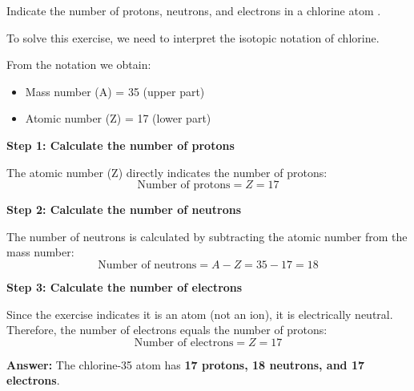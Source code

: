 \begin{exercise}
    Indicate the number of protons, neutrons, and electrons in a chlorine atom .

    \begin{solu}
        To solve this exercise, we need to interpret the isotopic notation of chlorine.

        From the notation  we obtain:
        \begin{itemize}
            \item Mass number (A) = 35 (upper part)
            \item Atomic number (Z) = 17 (lower part)
        \end{itemize}

        \textbf{Step 1: Calculate the number of protons}

        The atomic number (Z) directly indicates the number of protons:
        \[
            \text{Number of protons} = Z = 17
        \]

        \textbf{Step 2: Calculate the number of neutrons}

        The number of neutrons is calculated by subtracting the atomic number from the mass number:
        \[
            \text{Number of neutrons} = A - Z = 35 - 17 = 18
        \]

        \textbf{Step 3: Calculate the number of electrons}

        Since the exercise indicates it is an atom (not an ion), it is electrically neutral. Therefore, the number of electrons equals the number of protons:
        \[
            \text{Number of electrons} = Z = 17
        \]

        \textbf{Answer:} The chlorine-35 atom has \textbf{17 protons, 18 neutrons, and 17 electrons}.
    \end{solu}
\end{exercise}
